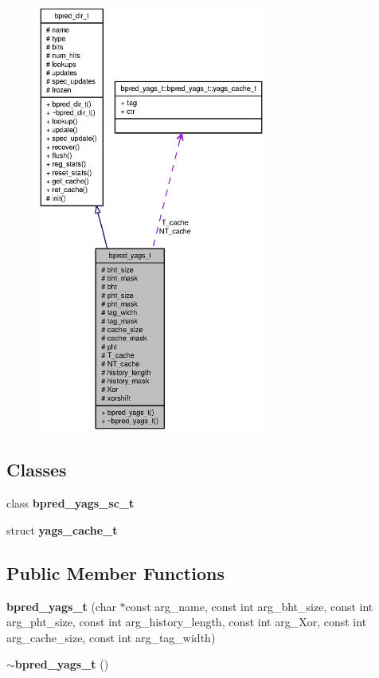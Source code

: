 \begin{figure}[H]
\begin{center}
\leavevmode
\includegraphics[height=400pt]{classbpred__yags__t__coll__graph}
\end{center}
\end{figure}
\subsection*{Classes}
\begin{CompactItemize}
\item 
class {\bf bpred\_\-yags\_\-sc\_\-t}
\item 
struct {\bf yags\_\-cache\_\-t}
\end{CompactItemize}
\subsection*{Public Member Functions}
\begin{CompactItemize}
\item 
{\bf bpred\_\-yags\_\-t} (char $\ast$const arg\_\-name, const int arg\_\-bht\_\-size, const int arg\_\-pht\_\-size, const int arg\_\-history\_\-length, const int arg\_\-Xor, const int arg\_\-cache\_\-size, const int arg\_\-tag\_\-width)
\item 
{\bf $\sim$bpred\_\-yags\_\-t} ()
\end{CompactItemize}
